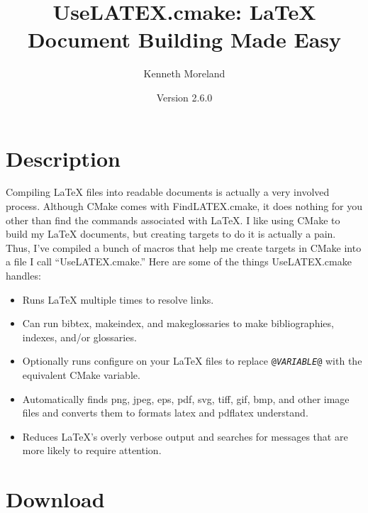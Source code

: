 \documentclass{article}
\newcommand{\UseLATEXVersion}{2.6.0}
\newcommand*{\textfile}[1]{\textsf{#1}}
\newcommand*{\textprog}[1]{\textfile{#1}}
\newcommand*{\textcmake}[1]{\texttt{#1}}
\newcommand*{\textvar}[1]{\textit{#1}}
\newcommand*{\UseLATEX}{\textfile{UseLATEX.cmake}\xspace}
\newcommand*{\latex}{\LaTeX\xspace}
\begin{document}
  \sloppy

  \title{UseLATEX.cmake: \latex Document Building Made Easy}
  \author{Kenneth Moreland}
  \date{Version \UseLATEXVersion}
  \maketitle

  \tableofcontents


  \section{Description}
  \label{sec:Description}

  Compiling \latex files into readable documents is actually a very
  involved process. Although CMake comes with \textfile{FindLATEX.cmake},
  it does nothing for you other than find the commands associated with
  \latex. I like using CMake to build my \latex documents, but creating
  targets to do it is actually a pain. Thus, I've compiled a bunch of
  macros that help me create targets in CMake into a file I call
  ``\UseLATEX.'' Here are some of the things \UseLATEX handles:

  \begin{itemize}
  \item Runs \latex multiple times to resolve links.
  \item Can run \textprog{bibtex}, \textprog{makeindex}, and
    \textprog{makeglossaries} to make bibliographies, indexes, and/or
    glossaries.
  \item Optionally runs configure on your \latex files to replace
    \textcmake{@\textvar{VARIABLE}@} with the equivalent CMake variable.
  \item Automatically finds png, jpeg, eps, pdf, svg, tiff, gif, bmp, and
    other image files and converts them to formats \textprog{latex} and
    \textprog{pdflatex} understand.
  \item Reduces \latex's overly verbose output and searches for messages
    that are more likely to require attention.
  \end{itemize}


  \section{Download}
  \label{sec:Download}
\end{document}
